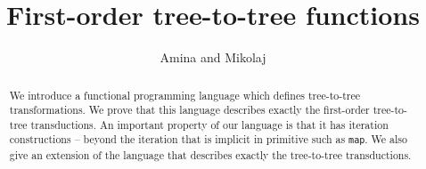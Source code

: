 \documentclass[sigplan,10pt,manonymous]{acmart}\settopmatter{printfolios=true,printccs=false,printacmref=false}
\begin{document}
 \title{First-order tree-to-tree functions}
 \author{Amina and Mikolaj}
 \begin{abstract}
    We introduce a functional programming language which defines tree-to-tree transformations. We prove that this language describes exactly the first-order tree-to-tree transductions. An important property of our language is that it has iteration constructions -- beyond the iteration that is implicit in primitive such as {\tt map}. We also give an extension of the language that describes exactly the \mso tree-to-tree transductions.
\end{abstract}

 \maketitle


















\appendix






% 
\end{document}
